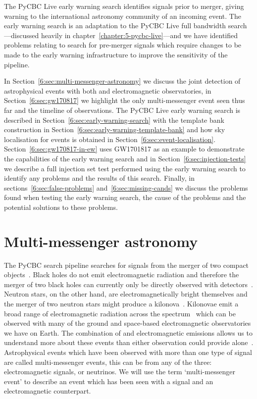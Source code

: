 The PyCBC Live early warning search identifies \gwadj signals prior to merger, giving warning to the international astronomy community of an incoming \gwadj event. The early warning search is an adaptation to the PyCBC Live full bandwidth search---discussed heavily in chapter~\ref{chapter:5-pycbc-live}---and we have identified problems relating to search for pre-merger signals which require changes to be made to the early warning infrastructure to improve the sensitivity of the pipeline.

In Section~\ref{6:sec:multi-messenger-astronomy} we discuss the joint detection of astrophysical events with both \gw and electromagnetic observatories, in Section~\ref{6:sec:gw170817} we highlight the only multi-messenger event seen thus far and the timeline of observations. The PyCBC Live early warning search is described in Section~\ref{6:sec:early-warning-search} with the template bank construction in Section~\ref{6:sec:early-warning-template-bank} and how sky localisation for events is obtained in Section~\ref{6:sec:event-localisation}. Section~\ref{6:sec:gw170817-in-ew} uses GW1701817 as an example to demonstrate the capabilities of the early warning search and in Section~\ref{6:sec:injection-tests} we describe a full injection set test performed using the early warning search to identify any problems and the results of this search. Finally, in sections~\ref{6:sec:false-problems} and~\ref{6:sec:missing-cands} we discuss the problems found when testing the early warning search, the cause of the problems and the potential solutions to these problems.

\section{\label{6:sec:multi-messenger-astronomy}Multi-messenger astronomy}

The PyCBC \gwadj search pipeline searches for \gwadj signals from the merger of two compact objects~\cite{PyCBC:2016}. Black holes do not emit electromagnetic radiation and therefore the merger of two black holes can currently only be directly observed with \gwadj detectors~\cite{Ghez:2000}. Neutron stars, on the other hand, are electromagnetically bright themselves and the merger of two neutron stars might produce a kilonova~\cite{Kilonovae:2017}. Kilonovae emit a broad range of electromagnetic radiation across the spectrum~\cite{kilonova_lightcurve:2017} which can be observed with many of the ground and space-based electromagnetic observatories we have on Earth. The combination of \gw and electromagnetic emissions allows us to understand more about these events than either observation could provide alone~\cite{multi_mess_astro:2019}. Astrophysical events which have been observed with more than one type of signal are called multi-messenger events, this can be from any of the three: electromagnetic signals, \gws or neutrinos. We will use the term `multi-messenger event' to describe an event which has been seen with a \gwadj signal and an electromagnetic counterpart.

